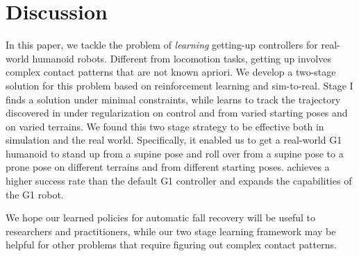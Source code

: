 \section{Discussion}
In this paper, we tackle the problem of {\it learning} getting-up controllers for real-world humanoid robots. Different from locomotion tasks, getting up involves complex contact patterns that are not known apriori. 
We develop a two-stage solution for this problem based on reinforcement learning and sim-to-real. Stage I finds a solution under minimal constraints, while \stwo learns to track the trajectory discovered in \sone under regularization on control and from varied starting poses and on varied terrains. We found this two stage strategy to be effective both in simulation and the real world. Specifically, it enabled us to get a real-world G1 humanoid to stand up from a supine pose and roll over from a supine pose to a prone pose on different terrains and from different starting poses. \ours achieves a higher success rate than the default G1 controller and expands the capabilities of the G1 robot.

We hope our learned policies for automatic fall recovery will be useful to researchers and practitioners, while our two stage learning framework may be helpful for other problems that require figuring out complex contact patterns.

